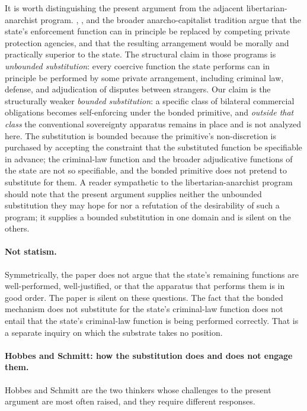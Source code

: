 \documentclass[11pt,a4paper]{article}
\theoremstyle{remark}
\begin{document}
It is worth distinguishing the present argument from the
adjacent libertarian-anarchist program. \citet{nozick1974anarchy},
\citet{friedman1973machinery}, and the broader anarcho-capitalist
tradition argue that the state's enforcement function can in
principle be replaced by competing private protection agencies,
and that the resulting arrangement would be morally and practically
superior to the state. The structural claim in those programs is
\emph{unbounded substitution}: every coercive function the state
performs can in principle be performed by some private
arrangement, including criminal law, defense, and adjudication of
disputes between strangers. Our claim is the structurally weaker
\emph{bounded substitution}: a specific class of bilateral
commercial obligations becomes self-enforcing under the bonded
primitive, and \emph{outside that class} the conventional
sovereignty apparatus remains in place and is not analyzed here.
The substitution is bounded because the primitive's non-discretion
is purchased by accepting the constraint that the substituted
function be specifiable in advance; the criminal-law function and
the broader adjudicative functions of the state are not so
specifiable, and the bonded primitive does not pretend to
substitute for them. A reader sympathetic to the
libertarian-anarchist program should note that the present
argument supplies neither the unbounded substitution they may
hope for nor a refutation of the desirability of such a program;
it supplies a bounded substitution in one domain and is silent
on the others.

\paragraph{Not statism.}
Symmetrically, the paper does not argue that the state's
remaining functions are well-performed, well-justified, or that
the apparatus that performs them is in good order. The paper is
silent on these questions. The fact that the bonded mechanism
does not substitute for the state's criminal-law function does
not entail that the state's criminal-law function is being
performed correctly. That is a separate inquiry on which the
substrate takes no position.

\paragraph{Hobbes and Schmitt: how the substitution does and does not engage them.}
Hobbes and Schmitt are the two thinkers whose challenges to the
present argument are most often raised, and they require
different responses.
\end{document}
